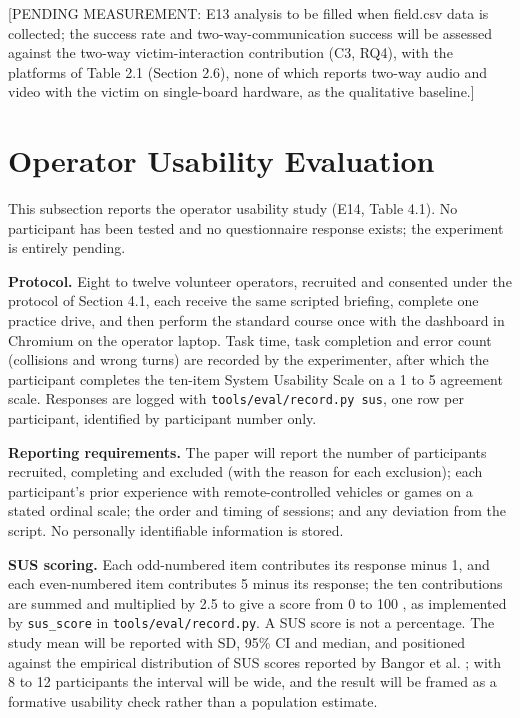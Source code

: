 [PENDING MEASUREMENT: E13 analysis to be filled when field.csv data is collected; the success rate and two-way-communication success will be assessed against the two-way victim-interaction contribution (C3, RQ4), with the platforms of Table 2.1 (Section 2.6), none of which reports two-way audio and video with the victim on single-board hardware, as the qualitative baseline.]

\section{Operator Usability Evaluation}

This subsection reports the operator usability study (E14, Table 4.1). No participant has been tested and no questionnaire response exists; the experiment is entirely pending.

\textbf{Protocol.} Eight to twelve volunteer operators, recruited and consented under the protocol of Section 4.1, each receive the same scripted briefing, complete one practice drive, and then perform the standard course once with the dashboard in Chromium on the operator laptop. Task time, task completion and error count (collisions and wrong turns) are recorded by the experimenter, after which the participant completes the ten-item System Usability Scale \cite{brooke1996} on a 1 to 5 agreement scale. Responses are logged with \texttt{tools/eval/record.py sus}, one row per participant, identified by participant number only.

\textbf{Reporting requirements.} The paper will report the number of participants recruited, completing and excluded (with the reason for each exclusion); each participant's prior experience with remote-controlled vehicles or games on a stated ordinal scale; the order and timing of sessions; and any deviation from the script. No personally identifiable information is stored.

\textbf{SUS scoring.} Each odd-numbered item contributes its response minus 1, and each even-numbered item contributes 5 minus its response; the ten contributions are summed and multiplied by 2.5 to give a score from 0 to 100 \cite{brooke1996}, as implemented by \texttt{sus\_score} in \texttt{tools/eval/record.py}. A SUS score is not a percentage. The study mean will be reported with SD, 95\% CI and median, and positioned against the empirical distribution of SUS scores reported by Bangor et al. \cite{bangor2008}; with 8 to 12 participants the interval will be wide, and the result will be framed as a formative usability check rather than a population estimate.

